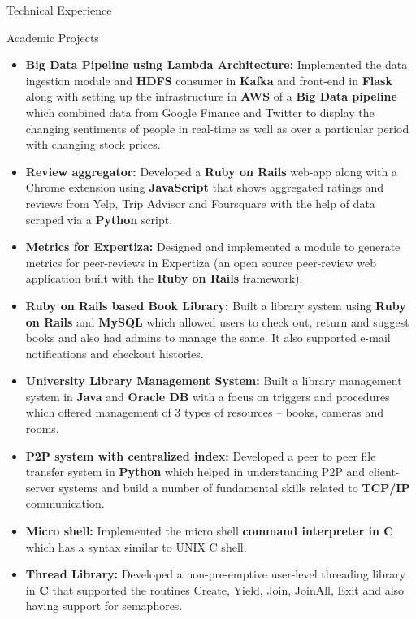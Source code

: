 \documentclass[]{mcdowellcv}
\begin{document}
	\begin{cvsection}{Technical Experience}
		\begin{cvsubsection}{Academic Projects}{}{}
			\begin{itemize}
            	\item \textbf{Big Data Pipeline using Lambda Architecture:} Implemented the data ingestion module and \textbf{HDFS} consumer in \textbf{Kafka} and front-end in \textbf{Flask} along with setting up the infrastructure in \textbf{AWS} of a \textbf{Big Data pipeline} which combined data from Google Finance and Twitter to display the changing sentiments of people in real-time as well as over a particular period with changing stock prices.
				\item \textbf{Review aggregator:} Developed a \textbf{Ruby on Rails} web-app along with a Chrome extension using \textbf{JavaScript} that shows aggregated ratings and reviews from Yelp, Trip Advisor and Foursquare with the help of data scraped via a \textbf{Python} script.
				\item  \textbf{Metrics for Expertiza:} Designed and implemented a module to generate metrics for peer-reviews in Expertiza (an open source peer-review web application built with the \textbf{Ruby on Rails} framework).
				\item  \textbf{Ruby on Rails based Book Library:} Built a library system using \textbf{Ruby on Rails} and \textbf{MySQL} which allowed users to check out, return and suggest books and also had admins to manage the same. It also supported e-mail notifications and checkout histories.
				\item  \textbf{University Library Management System:} Built a library management system in \textbf{Java} and \textbf{Oracle DB} with a focus on triggers and procedures which offered management of 3 types of resources – books, cameras and rooms.
				\item  \textbf{P2P system with centralized index:} Developed a peer to peer file transfer system in \textbf{Python}  which helped in understanding P2P and client-server systems and build a number of fundamental skills related to \textbf{TCP/IP} communication.
				\item  \textbf{Micro shell:} Implemented the micro shell \textbf{command interpreter in C} which has a syntax similar to UNIX C shell.
				\item  \textbf{Thread Library:} Developed a non-pre-emptive user-level threading library in \textbf{C} that supported the routines Create, Yield, Join, JoinAll, Exit and also having support for semaphores.

\end{itemize}
\end{cvsubsection}
\end{cvsection}
\end{document}
